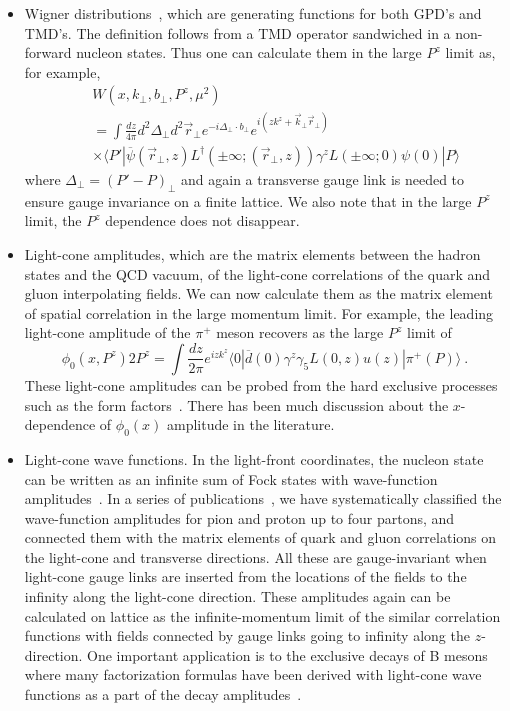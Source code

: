 \documentclass[aps,prd,preprint,tightenlines,superscriptaddress]{revtex4}
\begin{document}
\begin{itemize}
\item{Wigner distributions~\cite{viewing}, which are generating functions for both GPD's and TMD's.  The definition follows
 from a TMD operator sandwiched in a non-forward nucleon states. Thus one can calculate them in the large $P^z$ limit as, for example,
\begin{eqnarray}
  &&  W(x,k_\perp,b_\perp, P^z, \mu^2) \\ &&
  = \int \frac{dz}{4\pi} d^2\Delta_\perp d^2\vec{r}_\perp e^{-i\Delta_\perp \cdot b_\perp} e^{i(zk^z+\vec{k}_\perp \vec{r}_\perp)}\nonumber
    \\ && \times \langle P'|\overline{\psi}(\vec{r}_\perp,z)L^\dagger(\pm\infty; (\vec{r}_\perp,z))\gamma^z L(\pm\infty; 0)\psi(0) |P\rangle \nonumber
\end{eqnarray}
where $\Delta_\perp =(P'-P)_\perp$ and again a transverse gauge link is needed to ensure gauge invariance on a finite lattice. We also
note that in the large $P^z$ limit, the $P^z$ dependence does not disappear.}

\item{Light-cone amplitudes, which are the matrix elements between the hadron states and the QCD vacuum,
of the light-cone correlations of the quark and gluon interpolating fields. We can now calculate them as
the matrix element of spatial correlation in the large momentum limit. For example, the leading light-cone
amplitude of the $\pi^+$ meson recovers as the large $P^z$ limit of
\begin{equation}
\phi_0(x, P^z) 2P^z = \int \frac{dz}{2\pi} e^{izk^z}
\langle 0|\overline{d}(0)\gamma^z\gamma_5
L(0,z)u(z)| \pi^+(P)\rangle \ .
\end{equation}
These light-cone amplitudes can be probed from the hard exclusive processes such as the
form factors~\cite{Lepage:1980fj,Belitsky:2002kj}.
There has been much discussion about the $x$-dependence of $\phi_0(x)$ amplitude in the literature.}

\item{Light-cone wave functions. In the light-front coordinates, the nucleon state can be
written as an infinite sum of Fock states with wave-function amplitudes~\cite{brodsky}.
In a series of publications~\cite{Ji:2002xn}, we have systematically classified
the wave-function amplitudes for pion and proton up to four partons, and connected them with
the matrix elements of quark and gluon correlations on the light-cone and transverse directions.
All these are gauge-invariant when light-cone gauge links are inserted from the locations of the fields
to the infinity along the light-cone direction. These amplitudes again can be calculated on lattice as
the infinite-momentum limit of the similar correlation functions with fields connected by gauge links
going to infinity along the $z$-direction. One important application is to the exclusive decays
of B mesons where many factorization formulas have been derived with light-cone wave functions
as a part of the decay amplitudes~\cite{li}.}


\end{itemize}
\end{document}
